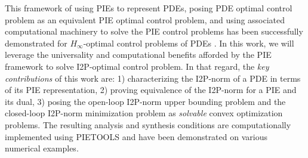 \documentclass[letterpaper, 10 pt, conference]{ieeeconf}
\theoremstyle{definition}
\begin{document}

This framework of using PIEs to represent PDEs, posing PDE optimal control problem as an equivalent PIE optimal control problem, and using associated computational machinery to solve the PIE control problems has been successfully demonstrated for $H_\infty$-optimal control problems of PDEs \cite{shivakumar_dual_2024}. In this work, we will leverage the universality and computational benefits afforded by the PIE framework to solve I2P-optimal control problem. In that regard, the \textit{key contributions} of this work are: 1) characterizing the I2P-norm of a PDE in terms of its PIE representation, 2) proving equivalence of the I2P-norm for a PIE and its dual, 3) posing the open-loop I2P-norm upper bounding problem and the closed-loop I2P-norm minimization problem as \emph{solvable} convex optimization problems. The resulting analysis and synthesis conditions are computationally implemented using PIETOOLS \cite{shivakumar_pietools_2025} and have been demonstrated on various numerical examples.

\end{document}
